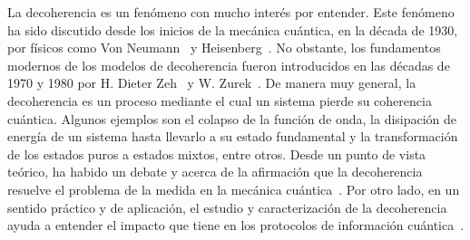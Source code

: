 La decoherencia es un fenómeno con mucho interés por entender. 
Este fenómeno ha sido discutido desde los inicios de la mecánica cuántica,
en la década de 1930, por físicos como
Von Neumann~\cite{von2018mathematical} y Heisenberg~\cite{bacciagaluppi2003role}.
No obstante, los fundamentos modernos de los modelos
de decoherencia fueron introducidos en las décadas de 1970 y 1980 
por H. Dieter Zeh~\cite{zeh1970interpretation}  y W. Zurek~\cite{zurek1981pointer}. 
 
De manera muy general, la decoherencia es un proceso mediante el cual 
un sistema pierde su coherencia cuántica. 
Algunos ejemplos son el colapso de 
la función de onda, la disipación de energía 
de un sistema hasta llevarlo a su estado fundamental y la transformación de los 
estados puros a estados mixtos, entre otros.
Desde un punto de vista teórico, ha habido un debate y acerca de la afirmación
que la decoherencia resuelve el problema de la medida en 
la mecánica cuántica~\cite{bacciagaluppi2003role}.
Por otro lado, en un sentido práctico y de aplicación, 
el estudio y caracterización de la decoherencia 
ayuda a entender el impacto que tiene en los protocolos de información 
cuántica~\cite{pepino2011open}. 

%   


